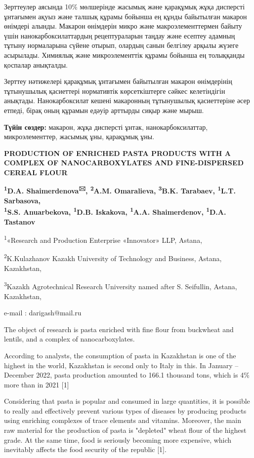 Зерттеулер аясында 10\% мөлшерінде жасымық және қарақұмық жұқа дисперсті
ұнтағымен ақуыз және талшық құрамы бойынша ең құнды байытылған макарон
өнімдері алынды. Макарон өнімдерін микро және макроэлементтермен байыту
үшін нанокарбоксилаттардың рецептураларын таңдау және есептеу адамның
тұтыну нормаларына сүйене отырып, олардың санын белгілеу арқылы жүзеге
асырылады. Химиялық және микроэлементтік құрамы бойынша ең толыққанды
қоспалар анықталды.

Зерттеу нәтижелері қарақұмық ұнтағымен байытылған макарон өнімдерінің
тұтынушылық қасиеттері нормативтік көрсеткіштерге сәйкес келетіндігін
анықтады. Нанокарбоксилат кешені макаронның тұтынушылық қасиеттеріне
әсер етпеді, бірақ оның құрамын едәуір арттырды сиқыр және мырыш.

{\bfseries Түйін сөздер:} макарон, жұқа дисперсті ұнтак,
нанокарбоксилаттар, микроэлементтер, жасымық ұны, қарақұмық ұны.

{\bfseries PRODUCTION OF ENRICHED PASTA PRODUCTS WITH A COMPLEX OF
NANOCARBOXYLATES AND FINE-DISPERSED CEREAL FLOUR}

{\bfseries \textsuperscript{1}D.A. Shaimerdenova\textsuperscript{🖂},
\textsuperscript{2}A.M. Omaralieva, \textsuperscript{3}B.K. Tarabaev,
\textsuperscript{1}L.T. Sarbasova,\\
\textsuperscript{1}S.S. Anuarbekova, \textsuperscript{1}D.B. Iskakova,
\textsuperscript{1}A.A. Shaimerdenov, \textsuperscript{1}D.A. Tastanov}

\textsuperscript{1}«Research and Production Enterprise «Innovator» LLP,
Astana,

\textsuperscript{2}K.Kulazhanov Kazakh University of Technology and
Business, Astana, Kazakhstan,

\textsuperscript{3}Kazakh Agrotechnical Research University named after
S. Seifullin, Astana, Kazakhstan,

e-mail : darigash@mail.ru

The object of research is pasta enriched with fine flour from buckwheat
and lentils, and a complex of nanocarboxylates.

According to analysts, the consumption of pasta in Kazakhstan is one of
the highest in the world, Kazakhstan is second only to Italy in this. In
January -- December 2022, pasta production amounted to 166.1 thousand
tons, which is 4\% more than in 2021 {[}1{]}

Considering that pasta is popular and consumed in large quantities, it
is possible to really and effectively prevent various types of diseases
by producing products using enriching complexes of trace elements and
vitamins. Moreover, the main raw material for the production of pasta is
"depleted" wheat flour of the highest grade. At the same time, food is
seriously becoming more expensive, which inevitably affects the food
security of the republic {[}1{]}.

